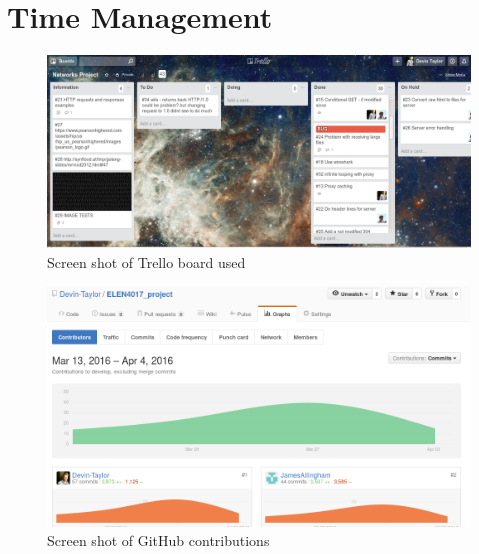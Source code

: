 \documentclass[10pt,twocolumn]{witseiepaper}
\begin{document}
\section{Time Management}
\label{app:time_man}
	\begin{figure}[h!]
		\centering
		\includegraphics[width=\columnwidth]{resources/trello_networks}
		\caption{Screen shot of Trello board used}
		\label{fig:trello}
	\end{figure}
	
	\begin{figure}[h!]
		\centering
		\includegraphics[width=\columnwidth]{resources/github_code}
		\caption{Screen shot of GitHub contributions}
		\label{fig:github}
	\end{figure}
	
\end{document}
